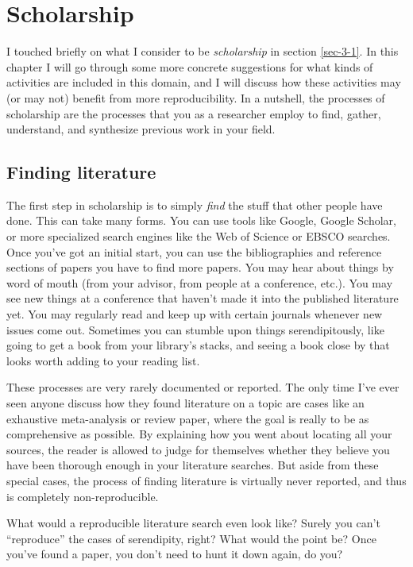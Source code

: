 \documentclass{book}
\begin{document}
\chapter{Scholarship}
\label{sec-4}
\label{scholarship}

I touched briefly on what I consider to be \emph{scholarship} in section \ref{sec-3-1}. In this chapter I will go through some more concrete suggestions for what kinds of activities are included in this domain, and I will discuss how these activities may (or may not) benefit from more reproducibility. In a nutshell, the processes of scholarship are the processes that you as a researcher employ to find, gather, understand, and synthesize previous work in your field.
\section{Finding literature}
\label{sec-4-1}

The first step in scholarship is to simply \emph{find} the stuff that other people have done. This can take many forms. You can use tools like Google, Google Scholar, or more specialized search engines like the Web of Science or EBSCO searches.  Once you've got an initial start, you can use the bibliographies and reference sections of papers you have to find more papers. You may hear about things by word of mouth (from your advisor, from people at a conference, etc.). You may see new things at a conference that haven't made it into the published literature yet.  You may regularly read and keep up with certain journals whenever new issues come out. Sometimes you can stumble upon things serendipitously, like going to get a book from your library's stacks, and seeing a book close by that looks worth adding to your reading list.

These processes are very rarely documented or reported. The only time I've ever seen anyone discuss how they found literature on a topic are cases like an exhaustive meta-analysis or review paper, where the goal is really to be as comprehensive as possible. By explaining how you went about locating all your sources, the reader is allowed to judge for themselves whether they believe you have been thorough enough in your literature searches.  But aside from these special cases, the process of finding literature is virtually never reported, and thus is completely non-reproducible.

What would a reproducible literature search even look like?  Surely you can't ``reproduce'' the cases of serendipity, right?  What would the point be?  Once you've found a paper, you don't need to hunt it down again, do you?
\end{document}
